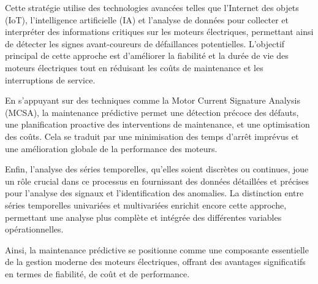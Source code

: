 Cette stratégie utilise des technologies avancées telles que l'Internet des
objets (IoT), l'intelligence artificielle (IA) et l'analyse de données pour
collecter et interpréter des informations critiques sur les moteurs
électriques, permettant ainsi de détecter les signes avant-coureurs de
défaillances potentielles. L’objectif principal de cette approche est
d’améliorer la fiabilité et la durée de vie des moteurs électriques tout en
réduisant les coûts de maintenance et les interruptions de service.

En s’appuyant sur des techniques comme la Motor Current Signature Analysis
(MCSA), la maintenance prédictive permet une détection précoce des défauts, une
planification proactive des interventions de maintenance, et une optimisation
des coûts. Cela se traduit par une minimisation des temps d’arrêt imprévus et
une amélioration globale de la performance des moteurs.

Enfin, l'analyse des séries temporelles, qu'elles soient discrètes ou
continues, joue un rôle crucial dans ce processus en fournissant des données
détaillées et précises pour l'analyse des signaux et l'identification des
anomalies. La distinction entre séries temporelles univariées et multivariées
enrichit encore cette approche, permettant une analyse plus complète et
intégrée des différentes variables opérationnelles.

Ainsi, la maintenance prédictive se positionne comme une composante essentielle
de la gestion moderne des moteurs électriques, offrant des avantages
significatifs en termes de fiabilité, de coût et de performance.